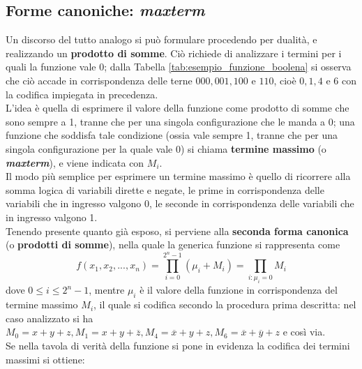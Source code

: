 \documentclass[a4paper]{extarticle}
\begin{document}
\subsection{Forme canoniche: \textit{maxterm}}
Un discorso del tutto analogo si può formulare procedendo per dualità, e realizzando un \textbf{prodotto di somme}. Ciò richiede di analizzare i termini per i quali la funzione vale 0; dalla Tabella \ref{tab:esempio_funzione_boolena} si osserva che ciò accade in corrispondenza delle terne \(000, 001, 100\) e \(110\), cioè \(0, 1, 4\) e \(6\) con la codifica impiegata in precedenza.\\
L’idea è quella di esprimere il valore della funzione come prodotto di somme che sono sempre a 1, tranne che per una singola configurazione che le manda a 0; una funzione che soddisfa tale condizione (ossia vale sempre 1, tranne che per una singola configurazione per la quale vale 0) si chiama \textbf{termine massimo} (o \textbf{\textit{maxterm}}), e viene indicata con \(M_i\).\\
Il modo più semplice per esprimere un termine massimo è quello di ricorrere alla somma logica di variabili dirette e negate, le prime in corrispondenza delle variabili che in ingresso valgono 0, le seconde in corrispondenza delle variabili che in ingresso valgono 1.\\
Tenendo presente quanto già esposo, si perviene alla \textbf{seconda forma canonica} (o \textbf{prodotti di somme}), nella quale la generica funzione si rappresenta come
\[f(x_1, x_2, ..., x_n) = \prod_{i = 0}^{2^n - 1} (\mu_i + M_i) = \prod_{i : \mu_i = 0} M_i\]
dove \(0 \leq i \leq 2^n - 1\), mentre \(\mu_i\) è il valore della funzione in corrispondenza del termine massimo \(M_i\), il quale si codifica secondo la procedura prima descritta: nel caso analizzato si ha \(M_0 = x + y + z, M_1 = x + y + \overline{z}, M_4 = \overline{x} + y + z, M_6 = \overline{x} + \overline{y} + z\) e così via.\\
Se nella tavola di verità della funzione si pone in evidenza la codifica dei termini massimi si ottiene:
\end{document}
